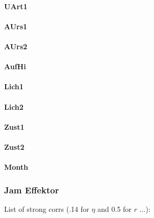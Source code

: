 \documentclass[a4paper,headsepline,footsepline,fontsize=11pt,BCOR=12mm,DIV=12]{report}
\begin{document}
\paragraph{UArt1}

\paragraph{AUrs1}

\paragraph{AUrs2}

\paragraph{AufHi}

\paragraph{Lich1}

\paragraph{Lich2}

\paragraph{Zust1}

\paragraph{Zust2}

\paragraph{Month}

\subsubsection{Jam Effektor}

List of strong corrs (.14 for $\eta$ and 0.5 for $r$ ...):
\end{document}
